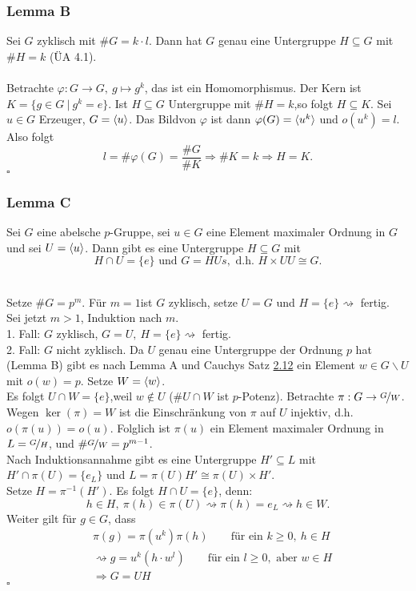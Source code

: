 \subsubsection*{Lemma B}
Sei $G$ zyklisch mit $\#G=k\cdot l$. Dann hat $G$ genau eine Untergruppe $H\subseteq G$ mit $\#H=k$ (ÜA 4.1).\\

\\
Betrachte $\varphi:G\to G,~g\mapsto g^k$, das ist ein Homomorphismus. Der Kern ist $K=\{g\in G~|~g^k=e \}$. Ist $H\subseteq G$ Untergruppe mit $\#H=k$,so folgt $H\subseteq K$. Sei $u\in G$ Erzeuger, $G=\langle u \rangle$. Das Bildvon $\varphi$ ist dann $\varphi(G)=\langle u^k \rangle$ und $o(u^k)=l$. Also folgt \[ l=\#\varphi(G)= \frac{\#G}{\#K} \Rightarrow \#K=k \Rightarrow H=K. \]
\hfill $\square$

\subsubsection*{Lemma C}
Sei $G$ eine abelsche $p$-Gruppe, sei $u\in G$ eine Element maximaler Ordnung in $G$ und sei $U=\langle u \rangle$. Dann gibt es eine Untergruppe $H\subseteq G$ mit
\[ H\cap U=\{e\} \text{ und } G=HUs, \text{ d.h. } H\times UU\cong G. \]

\\
Setze $\#G=p^m$. Für $m=1$ist $G$ zyklisch, setze $U=G$ und $H=\{e\} \rightsquigarrow$ fertig.\\
Sei jetzt $m>1$, Induktion nach $m$.\\
1. Fall: $G$ zyklisch, $G=U,~H=\{e\}\rightsquigarrow$ fertig.\\
2. Fall: $G$ nicht zyklisch. Da $U$ genau eine Untergruppe der Ordnung $p$ hat (Lemma B) gibt es nach Lemma A und Cauchys Satz \hyperref[sub:cauchys_satz]{2.12} ein Element $w\in G\backslash U$ mit $o(w)=p$. Setze $W=\langle w \rangle$.\\
Es folgt $U\cap W=\{e\}$,weil $w\notin U$ ($\#U\cap W$ ist $p$-Potenz). Betrachte $\pi:G\to \nicefrac{G}{W}$. Wegen $\ker(\pi)=W$ ist die Einschränkung von $\pi$ auf $U$ injektiv, d.h. $o(\pi(u))=o(u)$. Folglich ist $\pi(u)$ ein Element maximaler Ordnung in $L=\nicefrac{G}{H}$, und $\#\nicefrac{G}{W}=p^{m-1}$.\\

Nach Induktionsannahme gibt es eine Untergruppe $H'\subseteq L$ mit $H'\cap \pi(U)=\{e_L\}$ und $L=\pi(U)H'\cong \pi(U)\times H'$.\\
Setze $H=\pi^{-1}(H')$. Es folgt $H\cap U=\{e\}$, denn:
\[ h\in H,~\pi(h)\in \pi(U)\rightsquigarrow \pi(h)=e_L \rightsquigarrow h\in W. \]
Weiter gilt für $g\in G$, dass 
\begin{equation*}
\begin{aligned}
	&\pi(g)=\pi(u^k)\pi(h)\qquad \text{für ein } k\ge 0,~h\in H\\
	&\rightsquigarrow g=u^k(h\cdot w^l)\qquad\text{für ein } l\ge 0,\text{ aber } w\in H\\
	&\Rightarrow G=UH
\end{aligned}
\end{equation*}
\hfill $\square$

